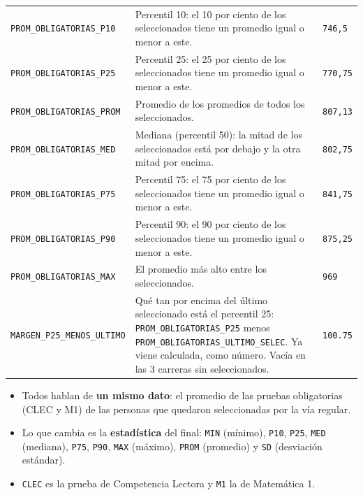 \documentclass[10.5pt]{article}
\begin{document}
\begin{xltabular}{\linewidth}{@{}p{4.5cm} >{\raggedright\arraybackslash}X p{3.4cm}@{}}
\texttt{PROM\_\allowbreak{}OBLIGATORIAS\_\allowbreak{}P10} & Percentil 10: el 10 por ciento de los seleccionados tiene un promedio igual o menor a este. & \texttt{746,5} \\
\texttt{PROM\_\allowbreak{}OBLIGATORIAS\_\allowbreak{}P25} & Percentil 25: el 25 por ciento de los seleccionados tiene un promedio igual o menor a este. & \texttt{770,75} \\
\texttt{PROM\_\allowbreak{}OBLIGATORIAS\_\allowbreak{}PROM} & Promedio de los promedios de todos los seleccionados. & \texttt{807,13} \\
\texttt{PROM\_\allowbreak{}OBLIGATORIAS\_\allowbreak{}MED} & Mediana (percentil 50): la mitad de los seleccionados está por debajo y la otra mitad por encima. & \texttt{802,75} \\
\texttt{PROM\_\allowbreak{}OBLIGATORIAS\_\allowbreak{}P75} & Percentil 75: el 75 por ciento de los seleccionados tiene un promedio igual o menor a este. & \texttt{841,75} \\
\texttt{PROM\_\allowbreak{}OBLIGATORIAS\_\allowbreak{}P90} & Percentil 90: el 90 por ciento de los seleccionados tiene un promedio igual o menor a este. & \texttt{875,25} \\
\texttt{PROM\_\allowbreak{}OBLIGATORIAS\_\allowbreak{}MAX} & El promedio más alto entre los seleccionados. & \texttt{969} \\
\texttt{MARGEN\_\allowbreak{}P25\_\allowbreak{}MENOS\_\allowbreak{}ULTIMO} & Qué tan por encima del último seleccionado está el percentil 25: \texttt{PROM\_\allowbreak{}OBLIGATORIAS\_\allowbreak{}P25} menos \texttt{PROM\_\allowbreak{}OBLIGATORIAS\_\allowbreak{}ULTIMO\_\allowbreak{}SELEC}. Ya viene calculada, como número. Vacía en las 3 carreras sin seleccionados. & \texttt{100.75} \\
\end{xltabular}

\begin{estrategiabox}
\begin{itemize}[leftmargin=1.1em,itemsep=2pt,topsep=2pt]
\item Todos hablan de \textbf{un mismo dato}: el promedio de las pruebas obligatorias (CLEC y M1) de las personas que quedaron seleccionadas por la vía regular.
\item Lo que cambia es la \textbf{estadística} del final: \texttt{MIN} (mínimo), \texttt{P10}, \texttt{P25}, \texttt{MED} (mediana), \texttt{P75}, \texttt{P90}, \texttt{MAX} (máximo), \texttt{PROM} (promedio) y \texttt{SD} (desviación estándar).
\item \texttt{CLEC} es la prueba de Competencia Lectora y \texttt{M1} la de Matemática 1.
\end{itemize}
\end{estrategiabox}
\end{document}
